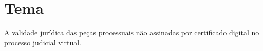 \chapter{Tema}
A validade jurídica das peças processuais não assinadas por certificado digital no processo judicial virtual.
